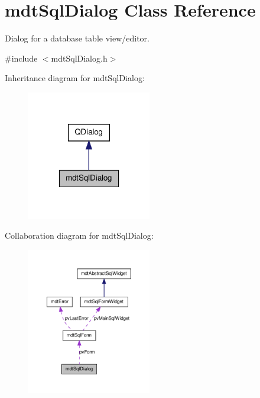 \hypertarget{classmdt_sql_dialog}{\section{mdt\-Sql\-Dialog Class Reference}
\label{classmdt_sql_dialog}
}


Dialog for a database table view/editor.  




{\ttfamily \#include $<$mdt\-Sql\-Dialog.\-h$>$}



Inheritance diagram for mdt\-Sql\-Dialog\-:
\nopagebreak
\begin{figure}[H]
\begin{center}
\leavevmode
\includegraphics[width=154pt]{classmdt_sql_dialog__inherit__graph}
\end{center}
\end{figure}


Collaboration diagram for mdt\-Sql\-Dialog\-:
\nopagebreak
\begin{figure}[H]
\begin{center}
\leavevmode
\includegraphics[width=154pt]{classmdt_sql_dialog__coll__graph}
\end{center}
\end{figure}
